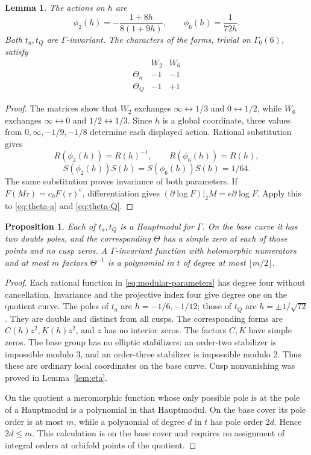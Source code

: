 \documentclass[11pt,a4paper]{article}
\newtheorem{lemma}[theorem]{Lemma}
\newtheorem{proposition}[theorem]{Proposition}
\theoremstyle{remark}
\newcommand{\dd}{\partial}
\newcommand{\Gbase}{\Gamma_0(6)}
\begin{document}
\begin{lemma}\label{lem:characters}
The actions on $h$ are
\[
 \phi_2(h)=-\frac{1+8h}{8(1+9h)},\qquad
 \phi_6(h)=\frac1{72h}.
\]
Both $t_a,t_Q$ are $\Gamma$-invariant. The characters of the forms,
trivial on $\Gbase$, satisfy
\[
\begin{array}{c|rr}
 &W_2&W_6\\\hline
 \Theta_a&-1&-1\\
 \Theta_Q&-1&+1
\end{array}
\]
\end{lemma}
\begin{proof}
The matrices show that $W_2$ exchanges
$\infty\leftrightarrow1/3$ and $0\leftrightarrow1/2$,
while $W_6$ exchanges $\infty\leftrightarrow0$ and
$1/2\leftrightarrow1/3$. Since $h$ is a global coordinate, three
values from $0,\infty,-1/9,-1/8$ determine each displayed action.
Rational substitution gives
\[
 R(\phi_2(h))=R(h)^{-1},\qquad R(\phi_6(h))=R(h),
\]
\[
 S(\phi_2(h))S(h)=S(\phi_6(h))S(h)=1/64.
\]
The same substitution proves invariance of both parameters.
If $F(M\tau)=c_0F(\tau)^e$, differentiation gives
$(\dd\log F)|_2M=e\dd\log F$. Apply this to
\eqref{eq:theta-a} and \eqref{eq:theta-Q}.
\end{proof}

\begin{proposition}\label{prop:poles}
Each of $t_a,t_Q$ is a Hauptmodul for $\Gamma$. On the base curve it
has two double poles, and the corresponding $\Theta$ has a simple zero
at each of those points and no cusp zeros. A $\Gamma$-invariant
function with holomorphic numerators and at most $m$ factors
$\Theta^{-1}$ is a polynomial in $t$ of degree at most
$\lfloor m/2\rfloor$.
\end{proposition}
\begin{proof}
Each rational function in \eqref{eq:modular-parameters} has degree
four without cancellation. Invariance and the projective index four
give degree one on the quotient curve. The poles of $t_a$ are
$h=-1/6,-1/12$; those of $t_Q$ are $h=\pm1/\sqrt{72}$.
They are double and distinct from all cusps. The corresponding forms
are $C(h)z^2,K(h)z^2$, and $z$ has no interior zeros. The factors
$C,K$ have simple zeros. The base group has no elliptic stabilizers:
an order-two stabilizer is impossible modulo $3$, and an order-three
stabilizer is impossible modulo $2$. Thus these are ordinary local
coordinates on the base curve. Cusp nonvanishing was proved in
Lemma~\ref{lem:eta}.

On the quotient a meromorphic function whose only possible pole is at
the pole of a Hauptmodul is a polynomial in that Hauptmodul. On the
base cover its pole order is at most $m$, while a polynomial of degree
$d$ in $t$ has pole order $2d$. Hence $2d\le m$. This calculation is
on the base cover and requires no assignment of integral orders at
orbifold points of the quotient.
\end{proof}
\end{document}
